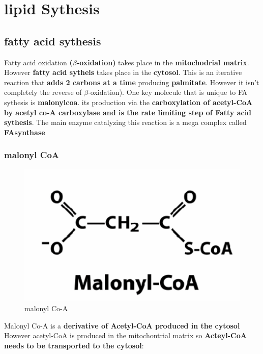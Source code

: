 \documentclass[../main.tex]{subfiles}
\begin{document}
	
\section{lipid Sythesis}
\subsection{fatty acid sythesis}
Fatty acid oxidation \textbf{($\beta$-oxidation)} takes place in the \textbf{mitochodrial matrix}. However \textbf{fatty acid sytheis} takes place in the \textbf{cytosol}. This is an iterative reaction that \textbf{adds 2 carbons at a time} producing  \textbf{palmitate}. However it isn't completely the reverse of $\beta$-oxidation). One key molecule that is unique to FA sythesis is \textbf{\gls{malonylcoa}}. its production via the \textbf{carboxylation of acetyl-CoA by acetyl co-A carboxylase and is the rate limiting step of Fatty acid sythesis}. The main enzyme catalyzing this reaction is a mega complex called \textbf{\gls{FAsynthase}}
\subsubsection{malonyl CoA}
\begin{figure}[H]
    \centering
    \includegraphics[width=0.25\linewidth]{Maloney.png}
    \caption{malonyl Co-A}
    \label{fig:enter-label}
\end{figure}
Malonyl Co-A is a \textbf{derivative of Acetyl-CoA produced in the cytosol} However acetyl-CoA is produced in the mitochontrial matrix so \textbf{Acteyl-CoA needs to be transported to the cytosol}:
\end{document}
